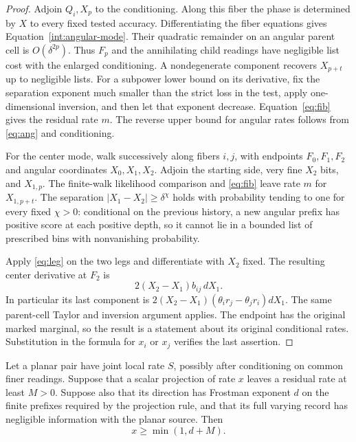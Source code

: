 \begin{proof}
Adjoin $Q_i,X_p$ to the conditioning. Along this fiber the
phase is determined by $X$ to every fixed tested accuracy.
Differentiating the fiber equations gives
Equation~\eqref{int:angular-mode}. Their quadratic remainder
on an angular parent cell is $O(\delta^{2p})$. Thus $F_p$
and the annihilating child readings have negligible list
cost with the enlarged conditioning. A nondegenerate
component recovers $X_{p+t}$ up to negligible lists. For a
subpower lower bound on its derivative, fix the separation
exponent much smaller than the strict loss in the test,
apply one-dimensional inversion, and then let that exponent
decrease. Equation~\eqref{eq:fib} gives the residual rate
$m$. The reverse upper bound for angular rates follows
from \eqref{eq:ang} and conditioning.

For the center mode, walk successively along fibers $i,j$,
with endpoints $F_0,F_1,F_2$ and angular coordinates
$X_0,X_1,X_2$. Adjoin the starting side, very fine $X_2$
bits, and $X_{1,p}$. The finite-walk likelihood comparison
and \eqref{eq:fib} leave rate $m$ for $X_{1,p+t}$. The
separation $|X_1-X_2|\geq\delta^\chi$ holds with probability
tending to one for every fixed $\chi>0$: conditional on the
previous history, a new angular prefix has positive score
at each positive depth, so it cannot lie in a bounded list
of prescribed bins with nonvanishing probability.

Apply \eqref{eq:leg} on the two legs and differentiate with
$X_2$ fixed. The resulting center derivative at $F_2$ is
\[
 2(X_2-X_1)b_{ij}\,dX_1.
\]
In particular its last component is
$2(X_2-X_1)(\theta_ir_j-\theta_jr_i)dX_1$.
The same parent-cell Taylor and inversion argument applies.
The endpoint has the original marked marginal, so the
result is a statement about its original conditional rates.
Substitution in the formula for $x_i$ or $x_j$ verifies
the last assertion.
\end{proof}

\begin{lemma}\label{int:boost}
Let a planar pair have joint local rate $S$, possibly after
conditioning on common finer readings. Suppose that a scalar
projection of rate $x$ leaves a residual rate at least $M>0$.
Suppose also that its direction has Frostman exponent $d$ on
the finite prefixes required by the projection rule, and that
its full varying record has negligible information with the
planar source. Then
\[
 x\geq\min(1,d+M).
\]
\end{lemma}

